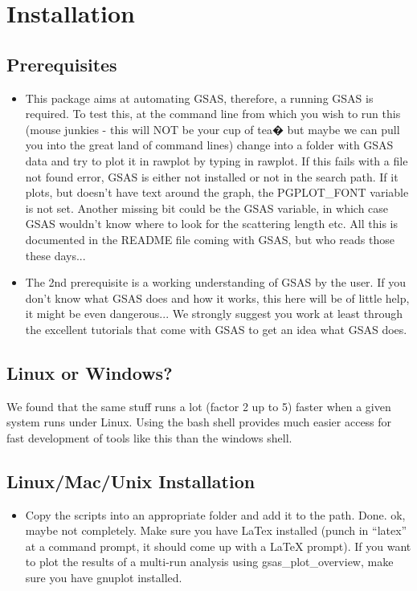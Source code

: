 \chapter{Installation}

\section{Prerequisites}

\begin{itemize}
	\item This package aims at automating GSAS, therefore, a running GSAS is required. To test this, at the command line from which you wish to run this (mouse junkies - this will NOT be your cup of tea� but maybe we can pull you into the great land of command lines) change into a folder with GSAS data and try to plot it in rawplot by typing in rawplot. If this fails with a file not found error, GSAS is either not installed or not in the search path. If it plots, but doesn't have text around the graph, the PGPLOT\_FONT variable is not set. Another missing bit could be the GSAS variable, in which case GSAS wouldn't know where to look for the scattering length etc. All this is documented in the README file coming with GSAS, but who reads those these days...
	\item The 2nd prerequisite is a working understanding of GSAS by the user. If you don't know what GSAS does and how it works, this here will be of little help, it might be even dangerous... We strongly suggest you work at least through the excellent tutorials that come with GSAS to get an idea what GSAS does.
\end{itemize}

\section{Linux or Windows?}

We found that the same stuff runs a lot (factor 2 up to 5) faster when a given system runs under Linux. Using the bash shell provides much easier access for fast development of tools like this than the windows shell.

\section{Linux/Mac/Unix Installation}

\begin{itemize}
\item Copy the scripts into an appropriate folder and add it to the path. Done.
ok, maybe not completely. Make sure you have LaTex installed (punch in ``latex'' at a command prompt, it should come up with a LaTeX prompt). If you want to plot the results of a multi-run analysis using gsas\_plot\_overview, make sure you have gnuplot installed.
\end{itemize}

